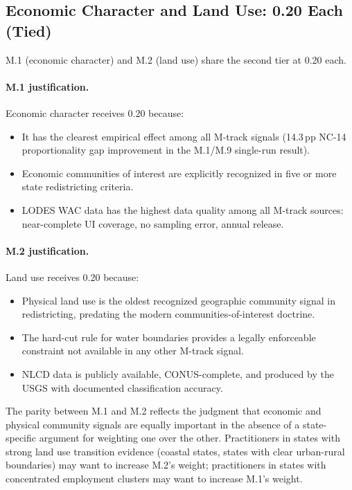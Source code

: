 \subsection{Economic Character and Land Use: 0.20 Each (Tied)}

M.1 (economic character) and M.2 (land use) share the second tier at 0.20 each.

\paragraph{M.1 justification.}
Economic character receives 0.20 because:
\begin{itemize}
  \item It has the clearest empirical effect among all M-track signals
    (14.3\,pp NC-14 proportionality gap improvement in the M.1/M.9 single-run
    result).
  \item Economic communities of interest are explicitly recognized in five
    or more state redistricting criteria.
  \item LODES WAC data has the highest data quality among all M-track sources:
    near-complete UI coverage, no sampling error, annual release.
\end{itemize}

\paragraph{M.2 justification.}
Land use receives 0.20 because:
\begin{itemize}
  \item Physical land use is the oldest recognized geographic community signal
    in redistricting, predating the modern communities-of-interest doctrine.
  \item The hard-cut rule for water boundaries provides a legally enforceable
    constraint not available in any other M-track signal.
  \item NLCD data is publicly available, CONUS-complete, and produced by
    the USGS with documented classification accuracy.
\end{itemize}

The parity between M.1 and M.2 reflects the judgment that economic and
physical community signals are equally important in the absence of a state-specific
argument for weighting one over the other.
Practitioners in states with strong land use transition evidence (coastal states,
states with clear urban-rural boundaries) may want to increase M.2's weight;
practitioners in states with concentrated employment clusters may want to
increase M.1's weight.

